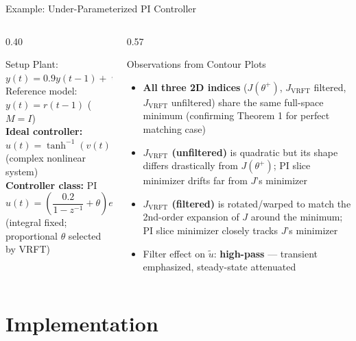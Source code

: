 \documentclass[aspectratio=169]{beamer}
\newcommand{\highlight}[1]{{\color{accentgreen!70!black}\textbf{#1}}}
\newcommand{\JJ}{J_{\mathrm{VRFT}}}
\begin{document}
\begin{frame}{Example: Under-Parameterized PI Controller}
  \begin{columns}[T]
    \begin{column}{0.40\textwidth}
      \begin{exampleblock}{Setup}
        \small
        Plant: $y(t) = 0.9y(t-1) + \tanh(u(t-1))$\\
        Reference model: $y(t) = r(t-1)$ ($M = I$)\\[0.3em]
        \textbf{Ideal controller:}
        $u(t) = \tanh^{-1}(v(t))$ (complex nonlinear system)\\[0.3em]
        \textbf{Controller class:} PI
        \[
          u(t) = \left(\frac{0.2}{1-z^{-1}} + \theta\right)e(t)
        \]
        (integral fixed; proportional $\theta$ selected by VRFT)
      \end{exampleblock}
    \end{column}
    \begin{column}{0.57\textwidth}
      \begin{block}{Observations from Contour Plots}
        \begin{itemize}
          \item \textbf{All three 2D indices} ($J(\theta^+)$, $\JJ$ filtered, $\JJ$ unfiltered) share the same full-space minimum (confirming Theorem 1 for perfect matching case)
          \item \textbf{$\JJ$ (unfiltered)} is quadratic but its shape differs drastically from $J(\theta^+)$; PI slice minimizer drifts far from $J$'s minimizer
          \item \textbf{$\JJ$ (filtered)} is rotated/warped to match the 2nd-order expansion of $J$ around the minimum; PI slice minimizer closely tracks $J$'s minimizer
          \item Filter effect on $\tilde{u}$: \highlight{high-pass} --- transient emphasized, steady-state attenuated
        \end{itemize}
      \end{block}
    \end{column}
  \end{columns}
\end{frame}

\section{Implementation}
\end{document}
